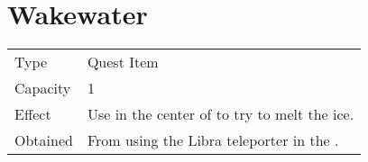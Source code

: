 \section{Wakewater}
\label{item:wakewater}


\noindent\begin{tabularx}{\textwidth}[l]{lX}
	Type
	& Quest Item
\\ %
	Capacity
	& 1
\\ %
	Effect
	& Use in the center of \nameref{map:aquaria} to try to melt the ice.
\\ %
	Obtained
	& From \nameref{map:life_temple} using the Libra teleporter in the \nameref{map:libra_temple}.
\end{tabularx}
